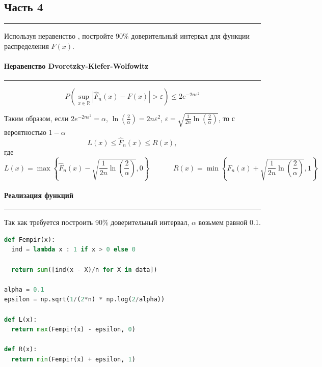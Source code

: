 \documentclass[a4paper, 14pt]{extarticle}
\begin{document}
\subsection{Часть 4}\vspace{-20pt}\rule{\linewidth}{0.1mm}

Используя неравенство , 
постройте 90\% доверительный интервал для функции распределения $F(x)$.

\paragraph{Неравенство Dvoretzky-Kiefer-Wolfowitz}\vspace{-20pt}\rule{\linewidth}{0.1mm}

\begin{equation*}
  P \left( \sup_{x \in \mathbb{R}} \left| \hat{F}_n(x) - F(x) \right| > \varepsilon \right) 
  \leq 2 e^{-2 n \varepsilon^2}
\end{equation*}

Таким образом, если $2 e^{-2 n \varepsilon^2} = \alpha$, $\ln(\frac{2}{\alpha}) = 
2 n \varepsilon^2$, $\varepsilon = \sqrt{\frac{1}{2 n} \ln(\frac{2}{\alpha})}$, то 
с вероятностью $1 - \alpha$
\begin{equation*}
  L(x) \leq \hat{F}_n(x) \leq R(x),
\end{equation*}
где
\begin{equation*}
  L(x) = \max \left\{ \hat{F}_n (x) - \sqrt{\frac{1}{2 n} \ln\left(\frac{2}{\alpha}\right)}, 0 \right\} 
  \hspace{40pt} 
  R(x) = \min \left\{ \hat{F}_n (x) + \sqrt{\frac{1}{2 n} \ln\left(\frac{2}{\alpha}\right)}, 1 \right\}
\end{equation*}

\paragraph{Реализация функций}\vspace{-20pt}\rule{\linewidth}{0.1mm}

Так как требуется построить 90\% доверительный интервал, $\alpha$ возьмем равной 0.1.\\

\begin{center}
  \begin{lstlisting}[language=Python]
def Fempir(x):
  ind = lambda x : 1 if x > 0 else 0

  return sum([ind(x - X)/n for X in data])

alpha = 0.1
epsilon = np.sqrt(1/(2*n) * np.log(2/alpha))

def L(x):
  return max(Fempir(x) - epsilon, 0)

def R(x):
  return min(Fempir(x) + epsilon, 1)
  \end{lstlisting}
\end{center}
\vspace{10pt}
\end{document}
